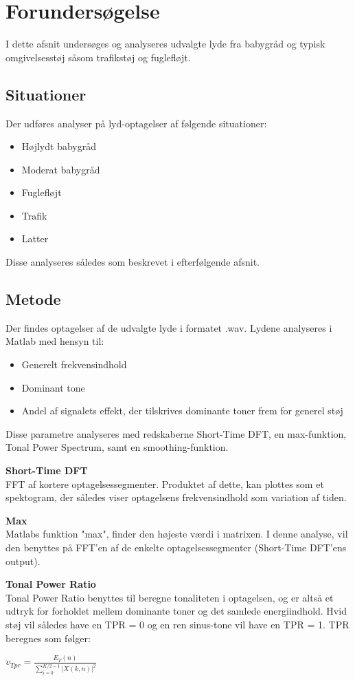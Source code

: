 \section{Forundersøgelse}

I dette afsnit undersøges og analyseres udvalgte lyde fra babygråd og typisk omgivelsesstøj såsom trafikstøj og fuglefløjt.

\subsection*{Situationer}
Der udføres analyser på lyd-optagelser af følgende situationer:
\begin{itemize}
	\item Højlydt babygråd
	\item Moderat babygråd
	\item Fuglefløjt
	\item Trafik
	\item Latter
\end{itemize} 
Disse analyseres således som beskrevet i efterfølgende afsnit.

\subsection{Metode}
Der findes optagelser af de udvalgte lyde i formatet .wav. Lydene analyseres i Matlab med hensyn til:
\begin{itemize}
	\item Generelt frekvensindhold
	\item Dominant tone
	\item Andel af signalets effekt, der tilskrives dominante toner frem for generel støj 
\end{itemize} 

Disse parametre analyseres med redskaberne Short-Time DFT, en max-funktion, Tonal Power Spectrum, samt en smoothing-funktion.

\textbf{Short-Time DFT} \\
FFT af kortere optagelsessegmenter. Produktet af dette, kan plottes som et spektogram, der således viser optagelsens frekvensindhold som variation af tiden.

\textbf{Max} \\
Matlabs funktion "max", finder den højeste værdi i matrixen. I denne analyse, vil den benyttes på FFT'en af de enkelte optagelsessegmenter (Short-Time DFT'ens output).

\textbf{Tonal Power Ratio} \\
Tonal Power Ratio benyttes til beregne tonaliteten i optagelsen, og er altså et udtryk for forholdet mellem dominante toner og det samlede energiindhold. Hvid støj vil således have en TPR = 0 og en ren sinus-tone vil have en TPR = 1. TPR beregnes som følger: 
\begin{center}
${ v }_{ Tpr }=\frac { { E }_{ T }(n) }{ \sum _{ i=0 }^{ K/2-1 }{ { \left| X(k,n) \right|  }^{ 2 } }  } $
\end{center}

